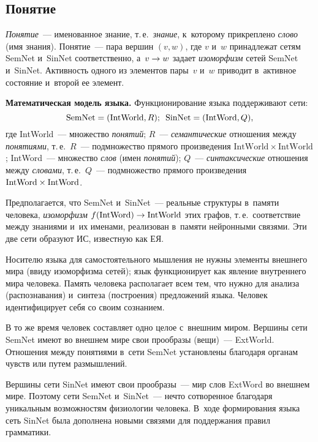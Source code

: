 \begin{multicols}{2}
\section{Понятие}

  \textit{Понятие}~--- именованное знание, т.\,е.\ \textit{знание}, 
к~которому прикреплено \textit{слово} (имя знания). Понятие~--- пара 
вершин $(v, w)$, где $v$ и~$w$ принадлежат сетям SemNet и~SinNet 
соответственно, а~$v\hm\to w$ задает \textit{изоморфизм} сетей SemNet 
и~SinNet. Ак\-тив\-ность одного из элементов пары~$v$ и~$w$ приводит 
в~активное со\-сто\-яние и~второй ее элемент.
  
  \textbf{Математическая модель языка.} Функционирование языка 
поддерживают сети: 
$$
\mathrm{SemNet}=(\mathrm{IntWorld},R); \enskip \mathrm{SinNet}=(\mathrm{IntWord},Q),
$$
 где 
IntWorld~--- множество \textit{понятий}; $R$~--- \textit{семантические} 
отношения между \textit{понятиями}, т.\,е.~$R$~--- под\-мно\-же\-ст\-во прямого 
произведения $\mathrm{IntWorld}\times \mathrm{IntWorld}$; IntWord~--- 
множество \textit{слов} (имен \textit{понятий}); $Q$~--- 
\textit{синтаксические} отношения между \textit{словами}, т.\,е.~$Q$~--- 
подмножество прямого произведения $\mathrm{IntWord}\hm\times 
\mathrm{IntWord}$. 
  
  Предполагается, что SemNet и~SinNet~--- реальные структуры в~памяти 
человека, \textit{изоморфизм} $f(\mathrm{IntWord})\hm\to\mathrm{IntWorld}$ этих графов, т.\,е.\
 соответствие между знаниями и~их именами, реализован в~памяти 
нейронными связями. Эти две сети образуют ИС, известную как ЕЯ.
  
  Носителю языка для самостоятельного мыш\-ле\-ния не нуж\-ны элементы 
внешнего мира (вви\-ду изоморфизма сетей); язык функционирует как 
явление внут\-рен\-не\-го мира человека. Память человека располагает всем 
тем, что нужно для анализа (распознавания) и~синтеза (по\-стро\-ения) 
предложений языка. Человек идентифицирует себя со своим со\-зна\-нием.
  
  В то же время человек со\-став\-ля\-ет одно целое с~внеш\-ним миром. 
Вершины сети SemNet имеют во внеш\-нем мире свои прообразы (вещи)~---
ExtWorld. Отношения между понятиями в~сети SemNet установлены 
благодаря органам чувств или путем размышлений. 
  
  Вершины сети SinNet имеют свои прообразы~--- мир слов ExtWord во 
внешнем мире. Поэтому сети SemNet и~SinNet~--- нечто со\-тво\-рен\-ное 
благодаря уникальным возможностям физиологии человека. В~ходе 
формирования языка сеть SinNet была дополнена новыми связями для 
поддержания правил грамматики.
  

\end{multicols}
